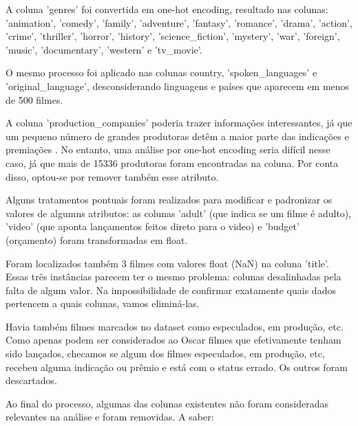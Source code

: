        A coluna 'genres' foi convertida em one-hot encoding, resultado nas colunas: 'animation', 'comedy', 'family', 'adventure', 'fantasy', 'romance', 'drama', 'action', 'crime', 'thriller', 'horror', 'history', 'science\_fiction', 'mystery', 'war', 'foreign', 'music', 'documentary', 'western' e 'tv\_movie'.

        O mesmo processo foi aplicado nas colunas country, 'spoken\_languages' e 'original\_language', desconsiderando linguagens e países que aparecem em menos de 500 filmes.

        A coluna 'production\_companies' poderia trazer informações interessantes, já que um pequeno número de grandes produtoras detêm a maior parte das indicações e premiações \cite{argon2020}. No entanto, uma análise por one-hot encoding seria difícil nesse caso, já que mais de 15336 produtoras foram encontradas na coluna. Por conta disso, optou-se por remover também esse atributo.

        Alguns tratamentos pontuais foram realizados para modificar e padronizar os valores de algumns atributos: as colunas 'adult' (que indica se um filme é adulto), 'video' (que aponta lançamentos feitos direto para o video) e 'budget' (orçamento) foram transformadas em float.
        
        Foram localizados também 3 filmes com valores float (NaN) na coluna 'title'. Essas três instâncias parecem ter o mesmo problema: colunas desalinhadas pela falta de algum valor. Na impossibilidade de confirmar exatamente quais dados pertencem a quais colunas, vamos eliminá-las.
        
        Havia também filmes marcados no dataset como especulados, em produção, etc. Como apenas podem ser considerados ao Oscar filmes que efetivamente tenham sido lançados, checamos se algum dos filmes especulados, em produção, etc, recebeu alguma indicação ou prêmio e está com o status errado. Os outros foram descartados.
        
        Ao final do processo, algumas das colunas existentes não foram consideradas relevantes na análise e foram removidas. A saber:

